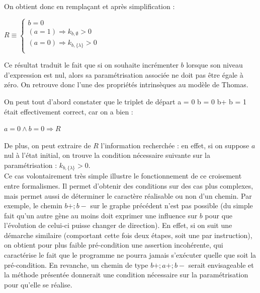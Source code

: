 On obtient donc en remplaçant et après simplification :
\begin{listesanspuce}
\item $R \equiv \left\{\begin{array}{l}
  b = 0\\
  (a = 1) \Rightarrow k_{b, \emptyset} > 0\\
  (a = 0) \Rightarrow k_{b, \{\lambda\}} > 0\\
\end{array}\right.$
\end{listesanspuce}
Ce résultat traduit le fait que si on souhaite incrémenter $b$ lorsque son niveau d'expression est nul, alors sa paramétrisation associée ne doit pas être égale à zéro. On retrouve donc l'une des propriétés intrinsèques au modèle de Thomas.

On peut tout d'abord constater que le triplet de départ \hbegini a = 0 \wedge b = 0 \ha b+ \hb b = 1 \hendi{} était effectivement correct, car on a bien :
\begin{listesanspuce}
  \item $a = 0 \wedge b = 0 \Rightarrow R$
\end{listesanspuce}
De plus, on peut extraire de $R$ l'information recherchée : en effet, si on suppose $a$ nul à l'état initial, on trouve la condition nécessaire suivante sur la paramétrisation : $k_{b, \{\lambda\}} > 0$.\\

Ce cas volontairement très simple illustre le fonctionnement de ce croisement entre formalismes. Il permet d'obtenir des conditions sur des cas plus complexes, mais permet aussi de déterminer le caractère réalisable ou non d'un chemin. Par exemple, le chemin $b+ ; b-$ sur le graphe précédent n'est pas possible (du simple fait qu'un autre gène au moins doit exprimer une influence sur $b$ pour que l'évolution de celui-ci puisse changer de direction). En effet, si on suit une démarche similaire (comportant cette fois deux étapes, soit une par instruction), on obtient pour plus faible pré-condition une assertion incohérente, qui caractérise le fait que le programme ne pourra jamais s'exécuter quelle que soit la pré-condition. En revanche, un chemin de type $b+ ; a+ ; b-$ serait envisageable et la méthode présentée donnerait une condition nécessaire sur la paramétrisation pour qu'elle se réalise.


